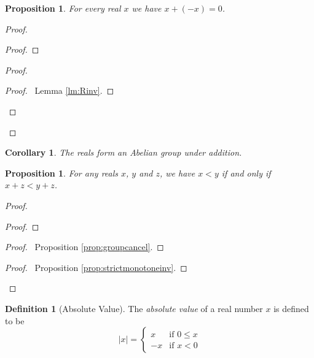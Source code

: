 \documentclass{book}
\let\qed\relax
\newtheorem{prop}[ax]{Proposition}
\newtheorem{cor}{Corollary}[ax]
\theoremstyle{definition}
\newtheorem{df}[ax]{Definition}
\begin{document}
\begin{prop}
For every real $x$ we have $x + (-x) = 0$.
\end{prop}

\begin{proof}
\pf
{}
\begin{proof}
\end{proof}
\begin{proof}
	\begin{proof}
		\pf\ Lemma \ref{lm:Rinv}.
	\end{proof}
\end{proof}
\qed
\end{proof}

\begin{cor}
The reals form an Abelian group under addition.
\end{cor}

\begin{prop}
For any reals $x$, $y$ and $z$, we have $x < y$ if and only if $x + z < y + z$.
\end{prop}

\begin{proof}
\pf
{}
\begin{proof}
\end{proof}
\begin{proof}
	\pf\ Proposition \ref{prop:groupcancel}.
\end{proof}
\qedstep
\begin{proof}
	\pf\ Proposition \ref{prop:strictmonotoneinv}.
\end{proof}
\qed
\end{proof}

\begin{df}[Absolute Value]
The \emph{absolute value} of a real number $x$ is defined to be
\[ |x| = \begin{cases}
x & \text{if } 0 \leq x \\
-x & \text{if } x < 0
\end{cases} \]
\end{df}
\end{document}
